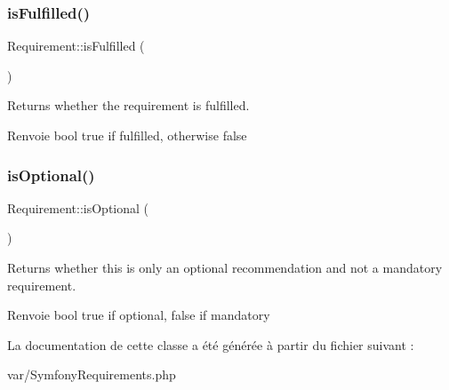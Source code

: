 \subsubsection{\texorpdfstring{is\+Fulfilled()}{isFulfilled()}}
{\footnotesize\ttfamily Requirement\+::is\+Fulfilled (\begin{DoxyParamCaption}{ }\end{DoxyParamCaption})}

Returns whether the requirement is fulfilled.

\begin{DoxyReturn}{Renvoie}
bool true if fulfilled, otherwise false 
\end{DoxyReturn}
\mbox{\label{classRequirement_a2e42f150791b2995f18048c7b21c7805}} 
\subsubsection{\texorpdfstring{is\+Optional()}{isOptional()}}
{\footnotesize\ttfamily Requirement\+::is\+Optional (\begin{DoxyParamCaption}{ }\end{DoxyParamCaption})}

Returns whether this is only an optional recommendation and not a mandatory requirement.

\begin{DoxyReturn}{Renvoie}
bool true if optional, false if mandatory 
\end{DoxyReturn}


La documentation de cette classe a été générée à partir du fichier suivant \+:\begin{DoxyCompactItemize}
\item 
var/Symfony\+Requirements.\+php\end{DoxyCompactItemize}
